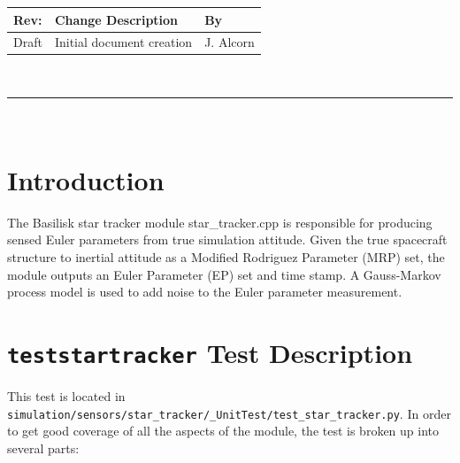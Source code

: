 \documentclass[]{BasiliskReportMemo}
\begin{document}
\makeCover


%
%
\pagestyle{empty}
{\renewcommand{\arraystretch}{1.1}
\noindent
\begin{longtable}{|p{0.5in}|p{4.5in}|p{1.14in}|}
\hline
{\bfseries Rev}: & {\bfseries Change Description} & {\bfseries By} \\
\hline
Draft & Initial document creation & J. Alcorn \\
\hline

\end{longtable}
}

\newpage
\setcounter{page}{1}
\pagestyle{fancy}

\tableofcontents
~\\ \hrule ~\\


\section{Introduction}
The Basilisk star tracker module star\_tracker.cpp is responsible for producing sensed Euler parameters from true simulation attitude. Given the true spacecraft structure to inertial attitude as a Modified Rodriguez Parameter (MRP) set, the module outputs an Euler Parameter (EP) set and time stamp. A Gauss-Markov process model is used to add noise to the Euler parameter measurement.

\section{{\tt test\textunderscore star\textunderscore tracker} Test Description}

This test is located in {\tt simulation/sensors/star\_tracker/\_UnitTest/test\_star\_tracker.py}. In order to get good coverage of all the aspects of the module, the test is broken up into several parts: \par
\end{document}
